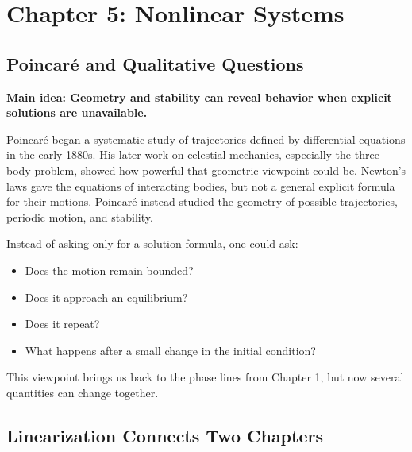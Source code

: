 \documentclass[11pt,letterpaper]{article}
\begin{document}
\section{Chapter 5: Nonlinear Systems}


\subsection{Poincar\'e and Qualitative Questions}

\textbf{Main idea: Geometry and stability can reveal behavior when explicit solutions are unavailable.}

Poincar\'e began a systematic study of trajectories
defined by differential equations in the early 1880s.
His later work on celestial mechanics, especially
the three-body problem, showed how powerful that
geometric viewpoint could be. Newton's laws gave
the equations of interacting bodies, but not a
general explicit formula for their motions.
Poincar\'e instead studied the geometry of possible
trajectories, periodic motion, and stability.


Instead of asking only for a solution formula,
one could ask:
\begin{itemize}
    \item Does the motion remain bounded?
    \item Does it approach an equilibrium?
    \item Does it repeat?
    \item What happens after a small change
    in the initial condition?
\end{itemize}

This viewpoint brings us back to the phase lines
from Chapter 1, but now several quantities
can change together.

\subsection{Linearization Connects Two Chapters}
\end{document}
